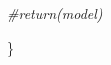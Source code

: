 \documentclass[
]{article}
\newenvironment{Shaded}{\begin{snugshade}}{\end{snugshade}}
\newcommand{\CommentTok}[1]{\textcolor[rgb]{0.56,0.35,0.01}{\textit{#1}}}
\newcommand{\NormalTok}[1]{#1}
\begin{document}
\begin{Shaded}
\begin{Highlighting}[]
  \CommentTok{\#return(model)}

\NormalTok{\}}
\end{Highlighting}
\end{Shaded}
\end{document}
